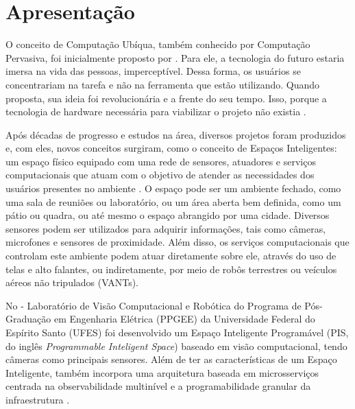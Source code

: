 \vspace{-42pt}

\section{Apresentação}

O conceito de Computação Ubíqua, também conhecido por Computação Pervasiva, foi inicialmente proposto por . Para ele, a tecnologia do futuro estaria imersa na vida das pessoas, imperceptível. Dessa forma, os usuários se concentrariam na tarefa e não na ferramenta que estão utilizando. Quando proposta, sua ideia foi revolucionária e a frente do seu tempo. Isso, porque a tecnologia de hardware necessária para viabilizar o projeto não existia \cite{satyanarayanan2001pervasive}.

Após décadas de progresso e estudos na área, diversos projetos foram produzidos e, com eles, novos conceitos surgiram, como o conceito de Espaços Inteligentes: um espaço físico equipado com uma rede de sensores, atuadores e serviços computacionais que atuam com o objetivo de atender as necessidades dos usuários presentes no ambiente \cite{carmo2021arquitetura}.  O espaço pode ser um ambiente fechado, como uma sala de reuniões ou laboratório, ou um área aberta bem definida, como um pátio ou quadra, ou até mesmo o espaço abrangido por uma cidade. Diversos sensores podem ser utilizados para adquirir informações, tais como câmeras, microfones e sensores de proximidade. Além disso, os serviços computacionais que controlam este ambiente podem atuar diretamente sobre ele, através do uso de telas e alto falantes, ou indiretamente, por meio de  robôs terrestres ou  veículos aéreos não tripulados (VANTs).

No  - Laboratório de Visão Computacional e Robótica do Programa de Pós-Graduação em Engenharia Elétrica (PPGEE) da Universidade Federal do Espírito Santo (UFES) foi desenvolvido um Espaço Inteligente Programável (PIS, do inglês \textit{Programmable Inteligent Space}) baseado em visão computacional, tendo câmeras como principais sensores. Além de ter as características de um Espaço Inteligente, também incorpora uma arquitetura baseada em microsserviços centrada na observabilidade multinível e a programabilidade granular da infraestrutura \cite{carmo2021arquitetura}.

